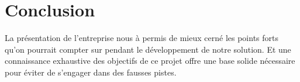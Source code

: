 \section{Conclusion} 

La présentation de l'entreprise nous à permis de mieux cerné les points
forts qu'on pourrait compter sur pendant le développement de notre
solution. Et une connaissance exhaustive des objectifs de ce projet
offre une base solide nécessaire pour éviter de s’engager dans des
fausses pistes.
